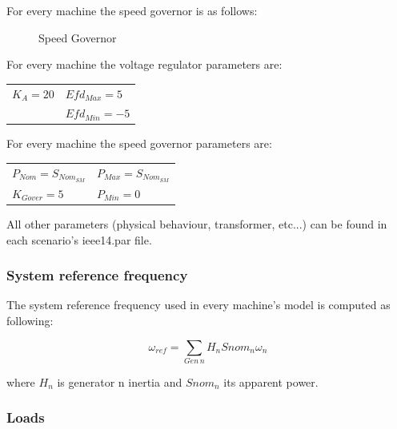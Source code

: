 \documentclass[a4paper, 12pt]{report}
\begin{document}
For every machine the speed governor is as follows:
\begin{figure}[H]
\centering
{}
\caption{Speed Governor}
\end{figure}

For every machine the voltage regulator parameters are:
\begin{center}
\begin{tabular}{l|l}
   $K_A=20$ & $Efd_{Max}=5$  \\
    & $Efd_{Min}=-5$   \\
\end{tabular}
\end{center}

For every machine the speed governor parameters are:
\begin{center}
\begin{tabular}{l|l}
   $P_{Nom}=S_{Nom_{SM}}$ & $P_{Max}=S_{Nom_{SM}}$  \\
   $K_{Gover}=5$ & $P_{Min}=0$   \\
\end{tabular}
\end{center}

All other parameters (physical behaviour, transformer, etc...) can be found in each scenario's ieee14.par file.

\subsubsection{System reference frequency}

The system reference frequency used in every machine's model is computed as following:

\[
 \omega_{ref} = \sum_{Gen \hspace{2pt} n} H_{n} Snom_{n} \omega_{n}
\]

where $H_{n}$ is generator n inertia and $Snom_{n}$ its apparent power.
\subsubsection{Loads}
\end{document}
